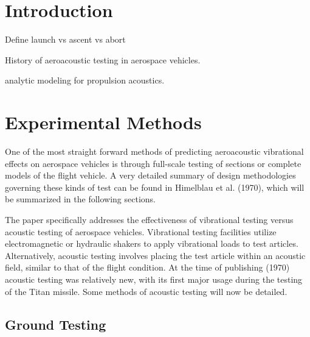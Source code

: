 \documentclass[]{aiaa-tc}%
\begin{document}





\section{Introduction} %

Define launch vs ascent vs abort



History of aeroacoustic testing in aerospace vehicles. \cite{SpaceVehicleAeroacousticVibrationPrediction}

analytic modeling for propulsion acoustics.\cite{AcousticPropulsionLoads}




\section{Experimental Methods}

One of the most straight forward methods of predicting aeroacoustic vibrational effects on aerospace vehicles is through full-scale testing of sections or complete models of the flight vehicle.  A very detailed summary of design methodologies governing these kinds of test can be found in Himelblau et al. (1970), \cite{SpaceVehicleAeroacousticVibrationPrediction} which will be summarized in the following sections.

The paper specifically addresses the effectiveness of vibrational testing versus acoustic testing of aerospace vehicles.  Vibrational testing facilities utilize electromagnetic or hydraulic shakers to apply vibrational loads to test articles.  Alternatively, acoustic testing involves placing the test article within an acoustic field, similar to that of the flight condition.  At the time of publishing (1970) acoustic testing was relatively new, with its first major usage during the testing of the Titan missile.  Some methods of acoustic testing will now be detailed.


\subsection{Ground Testing}
\end{document}
